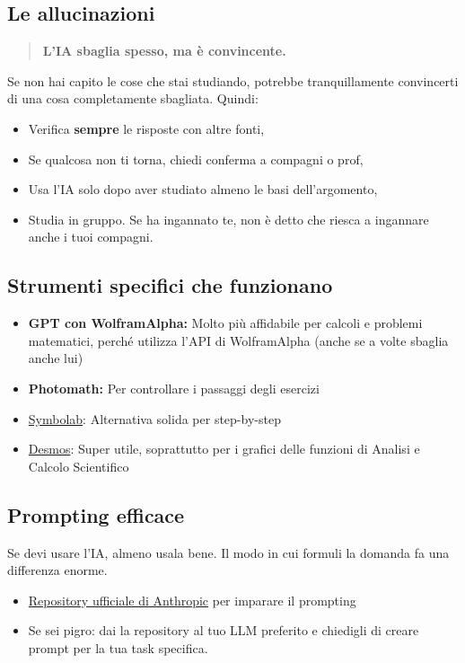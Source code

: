 \documentclass[18pt]{extarticle}
\begin{document}
\subsection{Le allucinazioni}
\begin{quote}
\textbf{L'IA sbaglia spesso, ma è convincente.}
\end{quote}
Se non hai capito le cose che stai studiando, potrebbe tranquillamente convincerti di una cosa completamente sbagliata. Quindi:
\begin{itemize}
\item Verifica \textbf{sempre} le risposte con altre fonti,
\item Se qualcosa non ti torna, chiedi conferma a compagni o prof,
\item Usa l'IA solo dopo aver studiato almeno le basi dell'argomento,
\item Studia in gruppo. Se ha ingannato te, non è detto che riesca a ingannare anche i tuoi compagni.
\end{itemize}


\subsection{Strumenti specifici che funzionano}
\begin{itemize}
\item \textbf{GPT con WolframAlpha:} Molto più affidabile per calcoli e problemi matematici, perché utilizza l'API di WolframAlpha (anche se a volte sbaglia anche lui)
\item \textbf{Photomath:} Per controllare i passaggi degli esercizi
\item \href{https://it.symbolab.com/}{Symbolab}: Alternativa solida per step-by-step
\item \href{https://www.desmos.com/calculator?lang=it}{Desmos}: Super utile, soprattutto per i grafici delle funzioni di Analisi e Calcolo Scientifico
\end{itemize}


\subsection{Prompting efficace}
Se devi usare l'IA, almeno usala bene. Il modo in cui formuli la domanda fa una differenza enorme.
\begin{itemize}
\item \href{https://github.com/anthropics/prompt-eng-interactive-tutorial}{Repository ufficiale di Anthropic} per imparare il prompting
\item Se sei pigro: dai la repository al tuo LLM preferito e chiedigli di creare prompt per la tua task specifica.
\end{itemize}
\end{document}
